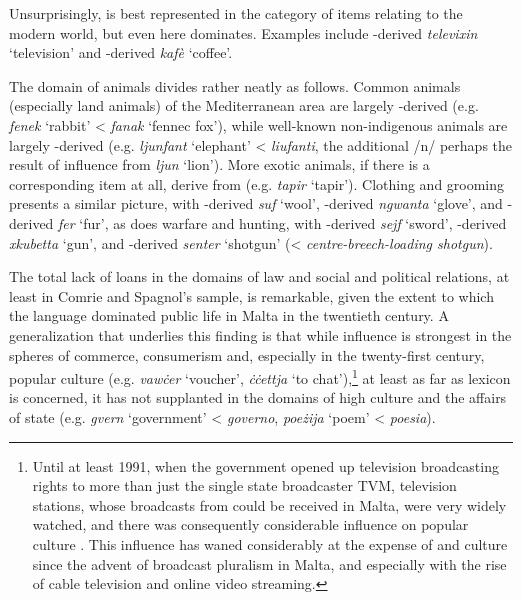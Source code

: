 \documentclass[output=paper]{langsci/langscibook}
\begin{document}
Unsurprisingly,  is best represented in the category of items relating to the modern world, but even here  dominates. Examples include -derived \textit{televixin} `television' and -derived \textit{kafè} `coffee'.


The domain of animals divides rather neatly as follows. Common animals (especially land animals) of the Mediterranean area are largely -derived (e.g. \textit{fenek} `rabbit' <   \textit{fanak} `fennec fox'), while well-known non-indigenous animals are largely -derived (e.g. \textit{ljunfant} `elephant' <  \textit{liufanti}, the additional /n/ perhaps the result of influence from \textit{ljun} `lion'). More exotic animals, if there is a corresponding  item at all, derive from  (e.g. \textit{tapir} `tapir'). Clothing and grooming presents a similar picture, with -derived \textit{suf} `wool', -derived \textit{ngwanta} `glove', and -derived \textit{fer} `fur', as does warfare and hunting, with -derived \textit{sejf} `sword', -derived \textit{xkubetta} `gun', and -derived \textit{senter} `shotgun' (< \textit{centre-breech-loading shotgun}).

The total lack of  loans in the domains of law and social and political relations, at least in Comrie and Spagnol's sample, is remarkable, given the extent to which the  language dominated public life in Malta in the twentieth century. A generalization that underlies this finding is that while  influence is strongest in the spheres of commerce, consumerism and, especially in the twenty-first century, popular culture (e.g. \textit{vawċer} `voucher', \textit{ċċettja} `to chat'),\footnote{Until at least 1991, when the  government opened up television broadcasting rights to more than just the single state broadcaster TVM,  television stations, whose broadcasts from  could be received in Malta, were very widely watched, and there was consequently considerable  influence on  popular culture \citep{sammut2007}. This influence has waned considerably at the expense of  and  culture since the advent of broadcast pluralism in Malta, and especially with the rise of cable television and online video streaming.} at least as far as  lexicon is concerned, it has not supplanted  in the domains of high culture and the affairs of state (e.g. \textit{gvern} `government' <  \textit{governo}, \textit{poeżija} `poem' <  \textit{poesia}).
\end{document}
